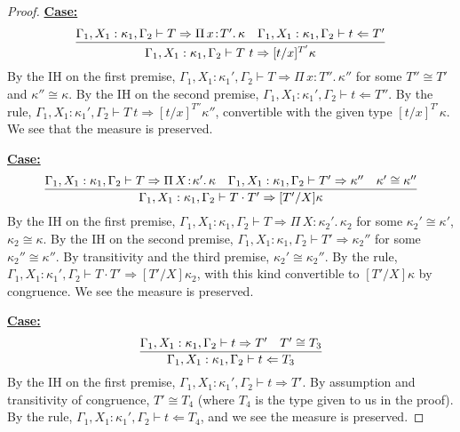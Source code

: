 \documentclass{article}
\newcommand{\abs}[4]{{#1}\, #2\! : \! #3.\, #4}
\newcommand{\tpcheck}[0]{\Leftarrow}
\newcommand{\tpsynth}[0]{\Rightarrow}
\newcommand{\startcase}[1]{\vspace{#1} \noindent\textbf{\underline{Case:}}}
\begin{document}
\begin{proof}
  \startcase{.2cm}
  \[
    \infer{
      \Gamma_1,X_1:\kappa_1,\Gamma_2 \vdash T\ t \tpsynth [t/x]^{T'}\kappa
    }{
      \Gamma_1,X_1:\kappa_1,\Gamma_2 \vdash T \tpsynth \abs{\Pi}{x}{T'}{\kappa}
      & \Gamma_1,X_1:\kappa_1,\Gamma_2 \vdash t \tpcheck T'
    }
  \]
  By the IH on the first premise, \(\Gamma_1,X_1:\kappa_1',\Gamma_2 \vdash T
  \tpsynth \abs{\Pi}{x}{T''}{\kappa''}\) for some \(T'' \cong T'\) and
  \(\kappa'' \cong \kappa\).
  By the IH on the second premise, \(\Gamma_1,X_1:\kappa_1',\Gamma_2 \vdash t
  \tpcheck T''\).
  By the rule, \(\Gamma_1,X_1:\kappa_1',\Gamma_2 \vdash T\ t \tpsynth
  [t/x]^{T''}\kappa''\), convertible with the given type \([t/x]^{T'}\kappa\).
  We see that the measure is preserved.

  \startcase{.2cm}
  \[
    \infer{
      \Gamma_1,X_1:\kappa_1,\Gamma_2 \vdash T \cdot T' \tpsynth
      [T'/X]\kappa
    }{
      \Gamma_1,X_1:\kappa_1,\Gamma_2 \vdash T \tpsynth
      \abs{\Pi}{X}{\kappa'}{\kappa}
      & \Gamma_1,X_1:\kappa_1,\Gamma_2 \vdash T' \tpsynth \kappa''
      & \kappa' \cong \kappa''}
  \]
  By the IH on the first premise, \(\Gamma_1,X_1:\kappa_1,\Gamma_2 \vdash T
  \tpsynth \abs{\Pi}{X}{\kappa_2'}{\kappa_2}\) for some \(\kappa_2' \cong
  \kappa'\), \(\kappa_2 \cong \kappa\).
  By the IH on the second premise, \(\Gamma_1,X_1:\kappa_1,\Gamma_2 \vdash T'
  \tpsynth \kappa_2''\) for some \(\kappa_2'' \cong \kappa''\).
  By transitivity and the third premise, \(\kappa_2' \cong \kappa_2''\).
  By the rule, \(\Gamma_1,X_1:\kappa_1',\Gamma_2 \vdash T \cdot T' \tpsynth
  [T'/X]\kappa_2\), with this kind convertible to \([T'/X]\kappa\) by
  congruence.
  We see the measure is preserved.

  \startcase{.2cm}
  \[
    \infer{
      \Gamma_1,X_1:\kappa_1,\Gamma_2 \vdash t\tpcheck T_3
    }{
      \Gamma_1,X_1:\kappa_1,\Gamma_2 \vdash t\tpsynth T'
      & T' \cong T_3
    }
  \]
  By the IH on the first premise, \(\Gamma_1,X_1:\kappa_1',\Gamma_2 \vdash t
  \tpsynth T'\).
  By assumption and transitivity of congruence, \(T' \cong T_4\) (where \(T_4\)
  is the type given to us in the proof).
  By the rule, \(\Gamma_1,X_1:\kappa_1',\Gamma_2 \vdash t \tpcheck T_4\), and we
  see the measure is preserved.


\end{proof}
\end{document}
